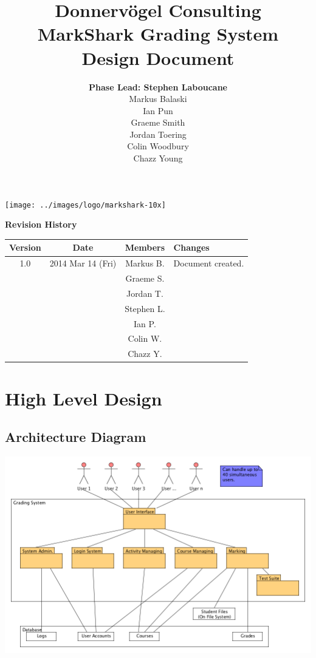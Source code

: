 \documentclass{article}
\begin{document}
\title{Donnervögel Consulting \\ MarkShark Grading System \\ Design Document}
\author{\textbf{Phase Lead: Stephen Laboucane} \\ Markus Balaski \\ Ian Pun \\
  Graeme Smith \\ Jordan Toering \\  Colin Woodbury \\ Chazz Young}
\maketitle
\centerline{\texttt{[image: ../images/logo/markshark-10x]}}
\clearpage

\textbf{Revision History}
\begin{center}
  \begin{tabular}{| c | c | c | l |}
    \hline
    Version & Date & Members & Changes\\
    \hline
    1.0 & 2014 Mar 14 (Fri) & Markus B. & Document created.\\
    & & Graeme S. & \\
    & & Jordan T. & \\
    & & Stephen L. & \\
    & & Ian P. & \\
    & & Colin W. & \\
    & & Chazz Y. & \\
    \hline
  \end{tabular}
\end{center}
\clearpage

\tableofcontents
\clearpage

\section{High Level Design}
\subsection{Architecture Diagram}
\centerline{\includegraphics[scale=0.6]{../images/architectureDiagram}}
\end{document}
